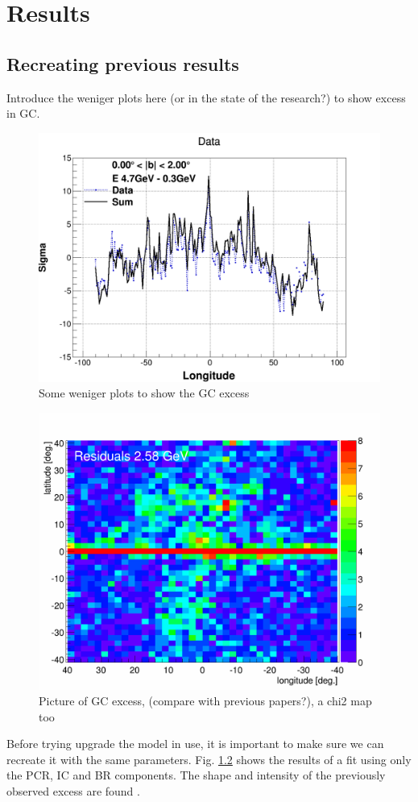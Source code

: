 \chapter{Results}
\label{ch:results}
%

\section{Recreating previous results}

Introduce the weniger plots here (or in the state of the research?) to show excess in GC.
\begin{figure}[h]
  \centering
  \includegraphics[width=.5\linewidth]{pic/results/Weniger_SUM_b0-2_E4,7-0,31GeV.png}
  \caption{Some weniger plots to show the GC excess}
  \label{fig:weniger_plot}
\end{figure}



\begin{figure}[h]
  \centering
  \includegraphics[width=.5\linewidth]{pic/results/BKGonly_halo_residuals.png}
  \caption{Picture of GC excess, (compare with previous papers?), a chi2 map too}
  \label{fig:original_GC_excess}
\end{figure}

Before trying upgrade the model in use, it is important to make sure we can recreate it with the same parameters. Fig. \ref{fig:original_GC_excess} shows the results of a fit using only the PCR, IC and BR components. The shape and intensity of the previously observed excess are found .\\

